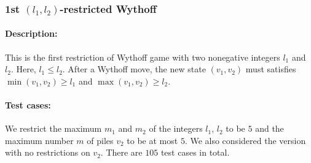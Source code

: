 \documentclass[review]{elsarticle}
\begin{document}
\subsubsection{1st $(l_1, l_2)$-restricted Wythoff \protect\cite{FraH2014}}

\paragraph{Description:} 
This is the first restriction of Wythoff game with two nonegative integers $l_1$ and $l_2$.
Here, $l_1 \le l_2$.
After a Wythoff move, the new state $(v_1, v_2)$ must satisfies $\min(v_1, v_2) \ge l_1$ and $\max(v_1, v_2) \ge l_2$.

\paragraph{Test cases:}
We restrict the maximum $m_1$ and $m_2$ of the integers $l_1$, $l_2$ to be $5$ and the maximum number $m$ of piles $v_2$ to be at most $5$.
We also considered the version with no restrictions on $v_2$.
There are $105$ test cases in total.
\end{document}
